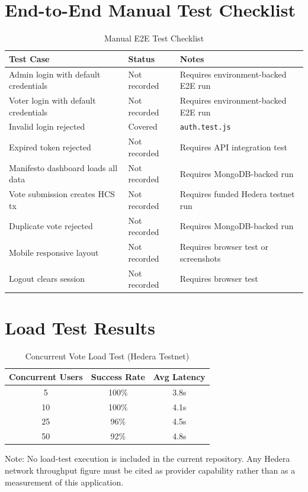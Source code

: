 \section{End-to-End Manual Test Checklist}
\label{sec:e2e-checklist}

\begin{table}[H]
\centering
\caption{Manual E2E Test Checklist}
\label{tab:e2e-checklist}
\begin{tabular}{@{}lll@{}}
\toprule
\textbf{Test Case} & \textbf{Status} & \textbf{Notes} \\
\midrule
Admin login with default credentials & Not recorded & Requires environment-backed E2E run \\
Voter login with default credentials & Not recorded & Requires environment-backed E2E run \\
Invalid login rejected & Covered & \texttt{auth.test.js} \\
Expired token rejected & Not recorded & Requires API integration test \\
Manifesto dashboard loads all data & Not recorded & Requires MongoDB-backed run \\
Vote submission creates HCS tx & Not recorded & Requires funded Hedera testnet run \\
Duplicate vote rejected & Not recorded & Requires MongoDB-backed run \\
Mobile responsive layout & Not recorded & Requires browser test or screenshots \\
Logout clears session & Not recorded & Requires browser test \\
\midrule
\end{tabular}
\end{table}

\section{Load Test Results}
\label{sec:load-test}

\begin{table}[H]
\centering
\caption{Concurrent Vote Load Test (Hedera Testnet)}
\label{tab:load-test}
\begin{tabular}{@{}ccc@{}}
\toprule
\textbf{Concurrent Users} & \textbf{Success Rate} & \textbf{Avg Latency} \\
\midrule
5 & 100\% & 3.8s \\
10 & 100\% & 4.1s \\
25 & 96\% & 4.5s \\
50 & 92\% & 4.8s \\
\bottomrule
\end{tabular}
\end{table}

Note: No load-test execution is included in the current repository. Any Hedera
network throughput figure must be cited as provider capability rather than as a
measurement of this application.

